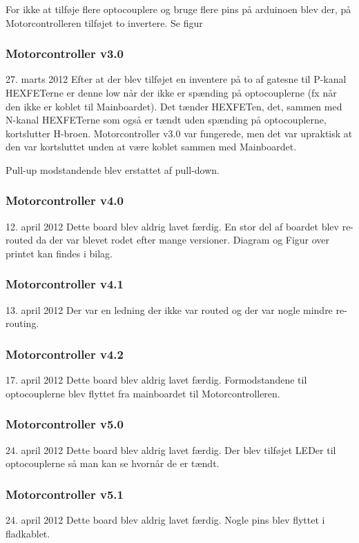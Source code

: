 \documentclass[a4paper,oneside,article,danish,table,draft]{memoir}
\newcommand{\boarddate}[1]{\textcolor{blue!80!black}{#1}}
\begin{document}
For ikke at tilføje flere optocouplere og bruge flere pins på arduinoen blev der, på Motorcontrolleren tilføjet to invertere. Se figur 
\subsubsection{Motorcontroller v3.0}
\boarddate{27. marts 2012}
Efter at der blev tilføjet en inventere på to af gatesne til P-kanal HEXFETerne er denne low når der ikke er spænding på optocouplerne (fx når den ikke er koblet til Mainboardet). Det tænder HEXFETen, det, sammen med N-kanal HEXFETerne som også er tændt uden spænding på optocouplerne, kortslutter H-broen. Motorcontroller v3.0 var fungerede, men det var upraktisk at den var kortsluttet unden at være koblet sammen med Mainboardet.

Pull-up modstandende blev erstattet af pull-down.
\subsubsection{Motorcontroller v4.0}
\boarddate{12. april 2012} Dette board blev aldrig lavet færdig. En stor del af boardet blev re-routed da der var blevet rodet efter mange versioner. Diagram og Figur over printet kan findes i bilag. 

\subsubsection{Motorcontroller v4.1}
\boarddate{13. april 2012}
Der var en ledning der ikke var routed og der var nogle mindre re-routing.

\subsubsection{Motorcontroller v4.2}
\boarddate{17. april 2012} Dette board blev aldrig lavet færdig.
Formodstandene til optocouplerne blev flyttet fra mainboardet til Motorcontrolleren.

\subsubsection{Motorcontroller v5.0}
\boarddate{24. april 2012} Dette board blev aldrig lavet færdig.
Der blev tilføjet LEDer til optocouplerne så man kan se hvornår de er tændt.  

\subsubsection{Motorcontroller v5.1}
\boarddate{24. april 2012} Dette board blev aldrig lavet færdig.
Nogle pins blev flyttet i fladkablet. 
\end{document}
